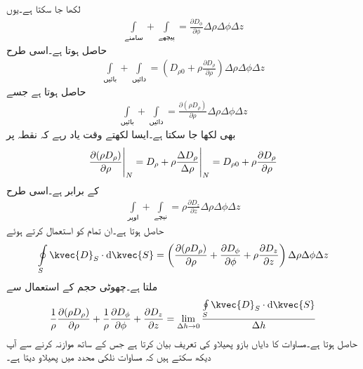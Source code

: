 لکھا جا سکتا ہے۔یوں
\begin{align*}
\int \limits_{\textrm{سامنے}}+\int\limits_{\textrm{پیچھے}}=\frac{\partial D_{\phi}}{\partial \phi} \Delta \rho \Delta \phi \Delta z
\end{align*}
حاصل ہوتا ہے۔اسی طرح
\begin{align*}
\int \limits_{\textrm{بائیں}}+\int \limits_{\textrm{دائیں}}=\left(D_{\rho 0} +\rho \frac{\partial D_{\rho}}{\partial \rho} \right) \Delta \rho \Delta \phi \Delta z
\end{align*}
حاصل ہوتا ہے جسے
\begin{align*}
\int \limits_{\textrm{بائیں}}+\int \limits_{\textrm{دائیں}}=\frac{\partial (\rho D_{\rho})}{\partial \rho}  \Delta \rho \Delta \phi \Delta z
\end{align*}
بھی لکھا جا سکتا ہے۔ایسا لکھتے وقت یاد رہے کہ نقطہ  پر
\begin{align*}
\eval{\frac{\partial (\rho D_{\rho})}{\partial \rho}}_{N}=\eval{D_{\rho}+\rho \frac{\Delta D_{\rho}}{\Delta \rho}}_{N}=D_{\rho 0} +\rho \frac{\partial D_{\rho}}{\partial \rho}
\end{align*}
کے برابر ہے۔اسی طرح
\begin{align*}
\int \limits_{\textrm{اوپر}}+\int\limits_{\textrm{نیچے}}=\rho \frac{\partial D_{z}}{\partial z} \Delta \rho \Delta \phi \Delta z
\end{align*}
حاصل ہوتا ہے۔ان تمام کو استعمال کرتے ہوئے
\begin{align*}
\oint\limits_{S} \kvec{D}_S \cdot \dif \kvec{S}=\left(\frac{\partial (\rho D_{\rho})}{\partial \rho}+\frac{\partial D_{\phi}}{\partial \phi}  + \rho \frac{\partial D_{z}}{\partial z}   \right)\Delta \rho \Delta \phi \Delta z
\end{align*}
ملتا ہے۔چھوٹی حجم  کے استعمال سے
\begin{align}\label{مساوات_گاوس_نلکی_پھیلاو_کی_تعریف}
\frac{1}{\rho}\frac{\partial (\rho D_{\rho})}{\partial \rho}+\frac{1}{\rho}\frac{\partial D_{\phi}}{\partial \phi}  +  \frac{\partial D_{z}}{\partial z}=\lim_{\Delta h \to 0} \frac{\oint\limits_{S} \kvec{D}_S \cdot \dif \kvec{S}}{\Delta h}
\end{align}
حاصل ہوتا ہے۔مساوات  کا دایاں بازو پھیلاو کی تعریف بیان کرتا ہے جس کے ساتھ موازنہ کرنے سے آپ دیکھ سکتے ہیں کہ مساوات  نلکی محدد میں پھیلاو  دیتا ہے۔

